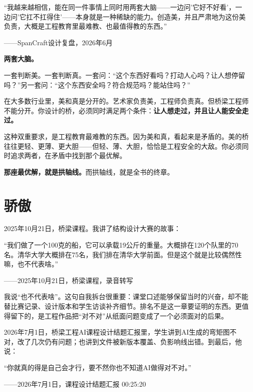 \begin{shiyu-inline}
``我越来越相信，能在同一件事情上同时用两套大脑——一边问'它好不好看'，一边问'它扛不扛得住'——本身就是一种稀缺的能力。创造美，并且严肃地为这份美负责，大概是工程教育里最难教、也最值得教的东西。''

\hfill ——SpanCraft设计复盘，2026年6月
\end{shiyu-inline}

\textbf{两套大脑。}

一套判断美。一套判断真。一套问：``这个东西好看吗？打动人心吗？让人想停留吗？''另一套问：``这个东西安全吗？符合规范吗？能站住吗？''

在大多数行业里，美和真是分开的。艺术家负责美，工程师负责真。但桥梁工程师不能分开。你设计的桥，必须同时满足两个条件：\textbf{让人想走过，并且让人能安全走过。}

这种双重要求，是工程教育最难教的东西。因为美和真，看起来是矛盾的。美的桥往往更轻、更薄、更大胆——但轻、薄、大胆，恰恰是工程安全的大敌。你必须同时追求两者，在矛盾中找到那个最优解。

\textbf{那座最优解，就是拱轴线。}而拱轴线，就是全书的终章。

\section{骄傲}

2025年10月21日，桥梁课程。我讲了结构设计大赛的故事：

\begin{shiyu-inline}
``我们做了一个100克的船，它可以承载19公斤的重量。大概排在120个队里的70名。清华大学大概排在75名，我们排在清华大学前面。但是这个就是比较偶然性嘛，也不代表啥。''

\hfill ——2025年10月21日，桥梁课程，录音转写
\end{shiyu-inline}

我说``也不代表啥''。这句自我拆台很重要：课堂口述能够保留当时的兴奋，却不能替比赛记录、设计版本和学生访谈补齐细节。排名不是这一章要证明的东西。更值得留下的，是工程作品把``对不对''从纸面问题变成了一个必须面对的后果。

2026年7月1日，桥梁工程AI课程设计结题汇报里，学生讲到AI生成的弯矩图不对，改了几次仍有问题；也讲到文件被新版本覆盖、负影响线出错。到最后，他说：

\begin{shiyu-inline}
``你就真的得是自己会才行，要不然你也不知道AI做得对不对。''

\hfill ——2026年7月1日，课程设计结题汇报 00:25:20
\end{shiyu-inline}

